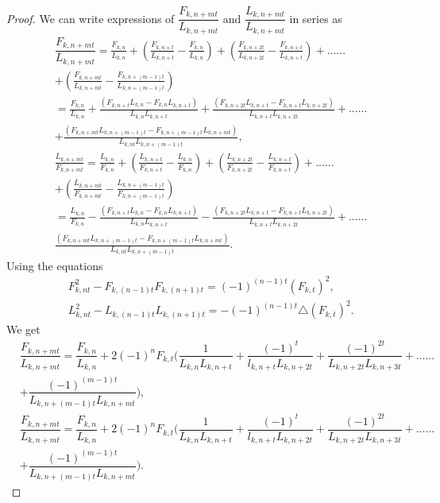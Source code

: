  \begin{proof}
We can write expressions of $\dfrac{F_{k,n+mt}}{L_{k,n+mt}}$ and $\dfrac{L_{k,n+mt}}{L_{k,n+mt}}$ in series as
\begin{align*}
&\dfrac{F_{k,n+mt}}{L_{k,n+mt}}= \frac{F_{k,n}}{L_{k,n}} +\left(\frac{F_{k,n+t}}{L_{k,n+t}} - \frac{F_{k,n}}{L_{k,n}}\right) + \left(\frac{F_{k,n+2t}}{L_{k,n+2t}}- \frac{F_{k,n+t}}{L_{k,n+t}}\right)+......\\&+\left(\frac{F_{k,n+mt}}{L_{k,n+mt}}- \frac{F_{k,n+(m-1)t}}{L_{k,n+(m-1)t}}\right)\\
&=\frac{F_{k,n}}{L_{k,n}} + \frac{( F_{k,n+t}L_{k,n} - F_{k,n}L_{k,n+t})}{L_{k,n} L_{k,n+t}} + \frac{( F_{k,n+2t}L_{k,n+t} - F_{k,n+t}L_{k,n+2t})}{L_{k,n+t} L_{k,n+2t}}+  ......\\&+ \frac{( F_{k,n+mt}L_{k,n+(m-1)t} - F_{k,n+(m-1)t}L_{k,n+mt})}{L_{k,nt} L_{k,n+(m-1)t}}, 
\\&\frac{L_{k,n+mt}}{F_{k,n+mt}}= \frac{L_{k,n}}{F_{k,n}} +\left(\frac{L_{k,n+t}}{F_{k,n+t}} - \frac{L_{k,n}}{F_{k,n}}\right) + \left(\frac{L_{k,n+2t}}{F_{k,n+2t}}- \frac{L_{k,n+t}}{F_{k,n+t}}\right)+......\\&+\left(\frac{L_{k,n+mt}}{F_{k,n+mt}}- \frac{L_{k,n+(m-1)t}}{F_{k,n+(m-1)t}}\right)\\
&= \frac{L_{k,n}}{F_{k,n}} - \frac{( F_{k,n+t}L_{k,n} - F_{k,n}L_{k,n+t})}{L_{k,n} L_{k,n+t}} - \frac{( F_{k,n+2t}L_{k,n+t} - F_{k,n+t}L_{k,n+2t})}{L_{k,n+t} L_{k,n+2t}} + ......\\& \frac{( F_{k,n+mt}L_{k,n+(m-1)t} - F_{k,n+(m-1)t}L_{k,n+mt})}{L_{k,nt} L_{k,n+(m-1)t}}. 
\end{align*}
Using the equations 
 \begin{align*}
 & F_{k,nt}^2 - F_{k,(n-1)t}F_{k,(n+1)t}=(-1)^{(n-1)t}(F_{k,t})^2,\\
&  L_{k,nt}^2 - L_{k,(n-1)t}L_{k,(n+1)t}=-(-1)^{(n-1)t}\triangle (F_{k,t})^2.
 \end{align*}
 We get
\begin{align*}
 &\dfrac{F_{k,n+mt}}{L_{k,n+mt}} = \dfrac{F_{k,n}}{L_{k,n}} + 2(-1)^n F_{k,t} ( \dfrac{1}{L_{k,n}L_{k,n+t}} + \dfrac{(-1)^{t}}{l_{k,n+t}L_{k,n+2t}}+ \dfrac{(-1)^{2t}}{L_{k,n+2t}L_{k,n+3t}} + ......\\&+  \dfrac{(-1)^{(m-1)t}}{L_{k,n+(m-1)t}L_{k,n+mt}}),\\
&\dfrac{F_{k,n+mt}}{L_{k,n+mt}} = \dfrac{F_{k,n}}{L_{k,n}} + 2(-1)^n F_{k,t} ( \dfrac{1}{L_{k,n}L_{k,n+t}} + \dfrac{(-1)^{t}}{l_{k,n+t}L_{k,n+2t}}+ \dfrac{(-1)^{2t}}{L_{k,n+2t}L_{k,n+3t}} + ......\\&+  \dfrac{(-1)^{(m-1)t}}{L_{k,n+(m-1)t}L_{k,n+mt}}).
 \end{align*}
 \end{proof}
 
